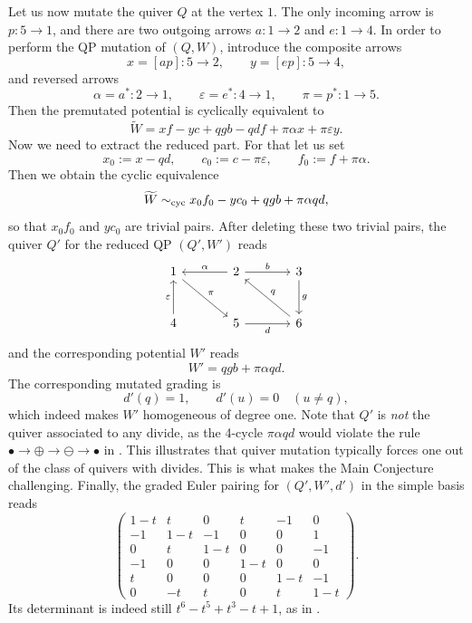 Let us now mutate the quiver $Q$ at the vertex $1$. The only incoming arrow is \(p:5\to1\), and there are two outgoing arrows \(a:1\to2\) and \(e:1\to4\). In order to perform the QP mutation of $(Q,W)$, introduce the composite arrows
\[
 x=[ap]:5\to2,\qquad y=[ep]:5\to4,
\]
and reversed arrows
\[
 \alpha=a^*:2\to1,\qquad
 \varepsilon=e^*:4\to1,\qquad
 \pi=p^*:1\to5.
\]
Then the premutated potential is cyclically equivalent to
\begin{equation}\label{eq:E6-premut}
 \widetilde W=xf-yc+qgb-qdf+\pi\alpha x+\pi\varepsilon y.
\end{equation}
Now we need to extract the reduced part. For that let us set
\[
 x_0:=x-qd,\qquad c_0:=c-\pi\varepsilon,
 \qquad f_0:=f+\pi\alpha.
\]
Then we obtain the cyclic equivalence
\[
 \widetilde W\sim_{\mathrm{cyc}}
 x_0f_0-yc_0+qgb+\pi\alpha qd,
\]
so that $x_0f_0$ and $yc_0$ are trivial pairs. After deleting these two trivial pairs, the quiver $Q'$ for the reduced QP $(Q',W')$ reads
\[
\begin{tikzcd}[column sep=large, row sep=large]
1
  \arrow[dr, "\pi"]
&
2
  \arrow[l, "\alpha"']
  \arrow[r, "b"]
&
3
  \arrow[d, "g"]
\\
4
  \arrow[u, "\varepsilon"]
&
5
  \arrow[r, "d"']
&
6
  \arrow[ul, "q"']
\end{tikzcd}
\]
and the corresponding potential $W'$ reads
\begin{equation}\label{eq:E6-mut-W}
 W'=qgb+\pi\alpha qd.
\end{equation}
The corresponding mutated grading is
\begin{equation}\label{eq:E6-mut-d}
 d'(q)=1,\qquad d'(u)=0\quad(u\ne q),
\end{equation}
which indeed makes $W'$ homogeneous of degree one. Note that $Q'$ is {\it not} the quiver associated to any divide, as the 4-cycle $\pi\alpha qd$ would violate the rule $\bullet\to\oplus\to\ominus\to\bullet$ in \cite[Definition 4.2]{FPST}. This illustrates that quiver mutation typically forces one out of the class of quivers with divides. This is what makes the Main Conjecture challenging. Finally, the graded Euler pairing for $(Q',W',d')$ in the simple basis reads
\begin{equation}\label{eq:E6-mut-E}
 \begin{pmatrix}
 1-t&t&0&t&-1&0\\
 -1&1-t&-1&0&0&1\\
 0&t&1-t&0&0&-1\\
 -1&0&0&1-t&0&0\\
 t&0&0&0&1-t&-1\\
 0&-t&t&0&t&1-t
 \end{pmatrix}.
\end{equation}
Its determinant is indeed still \(t^6-t^5+t^3-t+1\), as in .

